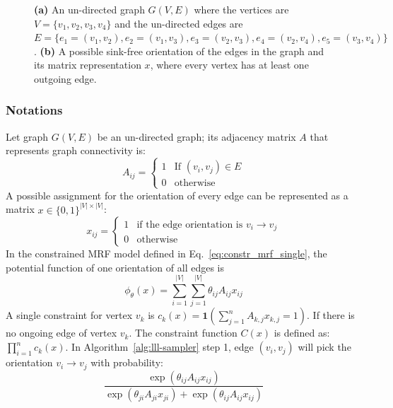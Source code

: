 \documentclass[letterpaper]{article} %
\begin{document}
\begin{figure}[t]
\caption{{\textbf{(a)} An un-directed graph $G(V,E)$ where the vertices are $V=\{v_1,v_2,v_3,v_4\}$ and the un-directed edges are $E=\{e_1=(v_1,v_2),e_2=(v_1,v_3),e_3=(v_2,v_3),e_4=(v_2,v_4),e_5=(v_3,v_4)\}$. \textbf{(b)} A possible sink-free orientation of the edges in the graph and its matrix representation $x$, where every vertex has at least one outgoing edge. }}
\label{fig:sinkfreeex}
\end{figure}

\subsubsection{Notations} Let  graph $G(V,E)$ be an  un-directed graph; its
 adjacency matrix $A$ that represents graph connectivity is:
\begin{equation}\label{eq:adjacency}
A_{ij}=\begin{cases}
{1}&\text{If } (v_i,v_j)\in E\\
0&\text{otherwise}
\end{cases}
\end{equation}
A possible assignment for the orientation of every edge can be represented as a matrix $x\in\{0,1\}^{|V|\times |V|}$:
\begin{equation}\label{eq:orientation-assign}
x_{ij}=\begin{cases}
1& \text{if the edge orientation is } v_i\to v_j \\
0&\text{otherwise}
\end{cases}
\end{equation}
In the constrained MRF model defined in Eq.~\eqref{eq:constr_mrf_single}, the potential function of one orientation of all edges is
\begin{equation*}
 \phi_{\theta}(x)=\sum_{i=1}^{|V|}\sum_{j=1}^{|V|}\theta_{ij}A_{ij}x_{ij}
\end{equation*}
A single constraint for vertex $v_k$ is $c_k(x)=\mathbf{1}\left(\sum_{j=1}^nA_{k,j}x_{k,j}=1\right)$. If there is no ongoing edge of vertex $v_k$. The  constraint function $C(x)$ is defined as: $\prod_{i=1}^nc_k(x)$. In Algorithm~\ref{alg:lll-sampler} step 1, edge $(v_i,v_j)$ will pick the orientation $v_i\to v_j$  with probability:
\begin{equation*}
\frac{\exp(\theta_{ij}A_{ij}x_{ij})}{\exp(\theta_{ji}A_{ji}x_{ji})+\exp(\theta_{ij}A_{ij}x_{ij})}
\end{equation*}
\end{document}
